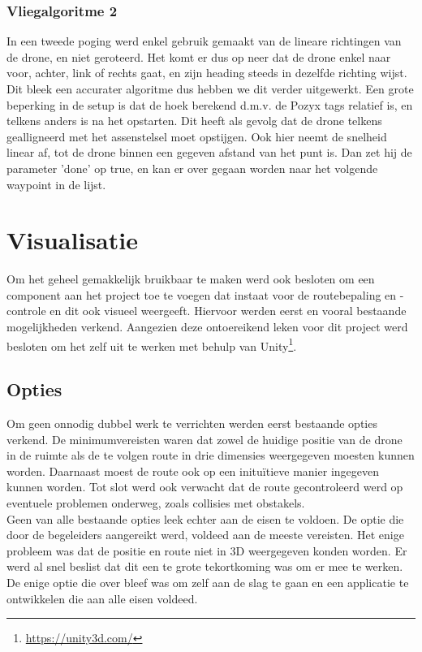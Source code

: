 \subsubsection{Vliegalgoritme 2}
In een tweede poging werd enkel gebruik gemaakt van de lineare richtingen van de drone, en niet geroteerd.
Het komt er dus op neer dat de drone enkel naar voor, achter, link of rechts gaat, en zijn heading steeds in dezelfde richting wijst.
Dit bleek een accurater algoritme dus hebben we dit verder uitgewerkt.
Een grote beperking in de setup is dat de hoek berekend d.m.v. de Pozyx tags relatief is, en telkens anders is na het opstarten.
Dit heeft als gevolg dat de drone telkens gealligneerd met het assenstelsel moet opstijgen.
Ook hier neemt de snelheid linear af, tot de drone binnen een gegeven afstand van het punt is.
Dan zet hij de parameter 'done' op true, en kan er over gegaan worden naar het volgende waypoint in de lijst.

\section{Visualisatie} \label{sec:visualization}
Om het geheel gemakkelijk bruikbaar te maken werd ook besloten om een component aan het project toe te voegen dat instaat voor de routebepaling en -controle en dit ook visueel weergeeft.
Hiervoor werden eerst en vooral bestaande mogelijkheden verkend.
Aangezien deze ontoereikend leken voor dit project werd besloten om het zelf uit te werken met behulp van Unity\footnote{\url{https://unity3d.com/}}.

\subsection{Opties} \label{sec:opties}
Om geen onnodig dubbel werk te verrichten werden eerst bestaande opties verkend.
De minimumvereisten waren dat zowel de huidige positie van de drone in de ruimte als de te volgen route in drie dimensies weergegeven moesten kunnen worden.
Daarnaast moest de route ook op een inituïtieve manier ingegeven kunnen worden.
Tot slot werd ook verwacht dat de route gecontroleerd werd op eventuele problemen onderweg, zoals collisies met obstakels.\\

Geen van alle bestaande opties leek echter aan de eisen te voldoen.
De optie die door de begeleiders aangereikt werd, voldeed aan de meeste vereisten.
Het enige probleem was dat de positie en route niet in 3D weergegeven konden worden.
Er werd al snel beslist dat dit een te grote tekortkoming was om er mee te werken.
De enige optie die over bleef was om zelf aan de slag te gaan en een applicatie te ontwikkelen die aan alle eisen voldeed.

